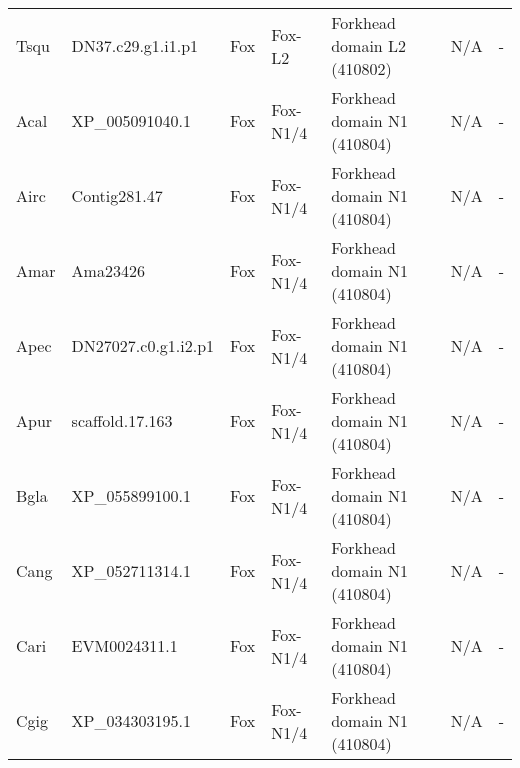 \documentclass[../main.tex]{subfiles}
\begin{document}
\begin{landscape}
\begin{longtable}{lllllll}
		Tsqu           & DN37.c29.g1.i1.p1     & Fox            & Fox-L2              & Forkhead domain L2 (410802)                 & N/A                                                                    & -                    \\
		Acal           & XP\_005091040.1       & Fox            & Fox-N1/4            & Forkhead domain N1 (410804)                 & N/A                                                                    & -                    \\
		Airc           & Contig281.47          & Fox            & Fox-N1/4            & Forkhead domain N1 (410804)                 & N/A                                                                    & -                    \\
		Amar           & Ama23426              & Fox            & Fox-N1/4            & Forkhead domain N1 (410804)                 & N/A                                                                    & -                    \\
		Apec           & DN27027.c0.g1.i2.p1   & Fox            & Fox-N1/4            & Forkhead domain N1 (410804)                 & N/A                                                                    & -                    \\
		Apur           & scaffold.17.163       & Fox            & Fox-N1/4            & Forkhead domain N1 (410804)                 & N/A                                                                    & -                    \\
		Bgla           & XP\_055899100.1       & Fox            & Fox-N1/4            & Forkhead domain N1 (410804)                 & N/A                                                                    & -                    \\
		Cang           & XP\_052711314.1       & Fox            & Fox-N1/4            & Forkhead domain N1 (410804)                 & N/A                                                                    & -                    \\
		Cari           & EVM0024311.1          & Fox            & Fox-N1/4            & Forkhead domain N1 (410804)                 & N/A                                                                    & -                    \\
		Cgig           & XP\_034303195.1       & Fox            & Fox-N1/4            & Forkhead domain N1 (410804)                 & N/A                                                                    & -                    \\

\end{longtable}
\end{landscape}
\end{document}
